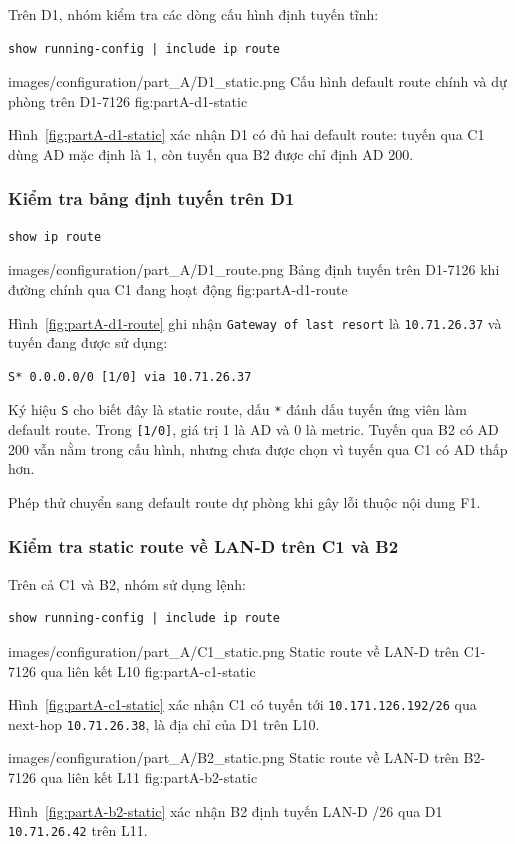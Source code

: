 Trên D1, nhóm kiểm tra các dòng cấu hình định tuyến tĩnh:

\begin{lstlisting}
show running-config | include ip route
\end{lstlisting}

\partzeroimage
{images/configuration/part_A/D1_static.png}
{Cấu hình default route chính và dự phòng trên D1-7126}
{fig:partA-d1-static}

Hình~\ref{fig:partA-d1-static} xác nhận D1 có đủ
hai default route: tuyến qua C1 dùng AD mặc định là 1,
còn tuyến qua B2 được chỉ định AD 200.

\subsubsection{Kiểm tra bảng định tuyến trên D1}

\begin{lstlisting}
show ip route
\end{lstlisting}

\partzeroimage
{images/configuration/part_A/D1_route.png}
{Bảng định tuyến trên D1-7126 khi đường chính qua C1 đang hoạt động}
{fig:partA-d1-route}

Hình~\ref{fig:partA-d1-route} ghi nhận
\texttt{Gateway of last resort} là \texttt{10.71.26.37}
và tuyến đang được sử dụng:

\begin{lstlisting}
S* 0.0.0.0/0 [1/0] via 10.71.26.37
\end{lstlisting}

Ký hiệu \texttt{S} cho biết đây là static route,
dấu \texttt{*} đánh dấu tuyến ứng viên làm default route.
Trong \texttt{[1/0]}, giá trị 1 là AD và 0 là metric.
Tuyến qua B2 có AD 200 vẫn nằm trong cấu hình,
nhưng chưa được chọn vì tuyến qua C1 có AD thấp hơn.

Phép thử chuyển sang default route dự phòng khi gây lỗi
thuộc nội dung F1.

\subsubsection{Kiểm tra static route về LAN-D trên C1 và B2}

Trên cả C1 và B2, nhóm sử dụng lệnh:

\begin{lstlisting}
show running-config | include ip route
\end{lstlisting}

\partzeroimage
{images/configuration/part_A/C1_static.png}
{Static route về LAN-D trên C1-7126 qua liên kết L10}
{fig:partA-c1-static}

Hình~\ref{fig:partA-c1-static} xác nhận C1 có tuyến tới
\texttt{10.171.126.192/26} qua next-hop
\texttt{10.71.26.38}, là địa chỉ của D1 trên L10.

\partzeroimage
{images/configuration/part_A/B2_static.png}
{Static route về LAN-D trên B2-7126 qua liên kết L11}
{fig:partA-b2-static}

Hình~\ref{fig:partA-b2-static} xác nhận B2 định tuyến
LAN-D /26 qua D1 \texttt{10.71.26.42} trên L11.

\newpage
